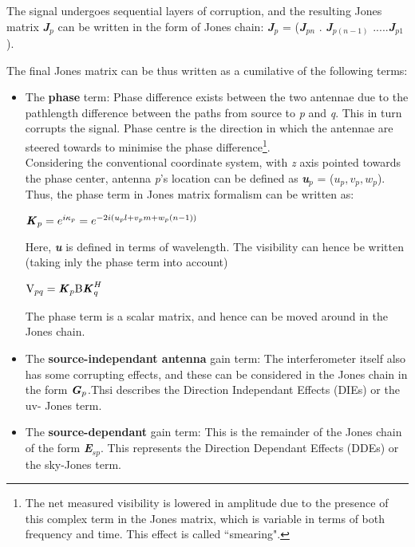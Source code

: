 \documentclass[../main/thesis_msc.tex]{subfiles}
\begin{document}
\noindent The signal undergoes sequential layers of corruption, and the resulting Jones matrix \textbf{\textit{J}}$_{p}$  can be written in the form of Jones chain: \textbf{\textit{J}}$_{p}$  = (\textbf{\textit{J}}$_{pn}$ . \textbf{\textit{J}}$_{p(n - 1)}$ .....\textbf{\textit{J}}$_{p1}$ ). 

\noindent The final Jones matrix can be thus written as a cumilative of the following terms:
\begin{itemize}
\item The \textbf{phase} term: Phase difference exists between the two antennae due to the pathlength difference between the paths from source to \textit{p} and \textit{q}. This in turn corrupts the signal. Phase centre is the direction in which the antennae are steered towards to minimise the phase difference\footnote{The net measured visibility is lowered in amplitude due to the presence of this complex term in the Jones matrix, which is variable in terms of both frequency and time. This effect is called ``smearing".}.  \\
Considering the conventional coordinate system, with \textit{z} axis pointed towards the phase center, antenna \textit{p}'s location can be defined as \textit{\textbf{u}}$_p$ = ($u_p, v_p, w_p$). Thus, the phase term in Jones matrix formalism can be written as: \\
\begin{center}
$\textbf{\textit{K}}_p = e^{i \kappa_p} = e^{-2i(u_pl + v_pm + w_p(n-1))}$
\end{center}
Here, \textit{\textbf{u}} is defined in terms of wavelength. The visibility can hence be written (taking inly the phase term into account)
\begin{center}
$\textrm{V}_{pq} = \textbf{\textit{K}}_p \textrm{B} \textbf{\textit{K}}_q^H$
\end{center}
The phase term is a scalar matrix, and hence can be moved around in the Jones chain.
\item The \textbf{source-independant antenna} gain term: The interferometer itself also has some corrupting effects, and these can be considered in the Jones chain in the form $\textbf{\textit{G}}_p$.Thsi describes the Direction Independant Effects (DIEs) or the uv- Jones term.
\item The \textbf{source-dependant} gain term: This is the remainder of the Jones chain of the form \textbf{\textit{E}}$_{sp}$. This represents the Direction Dependant Effects (DDEs) or the sky-Jones term.

\end{itemize}
\end{document}
